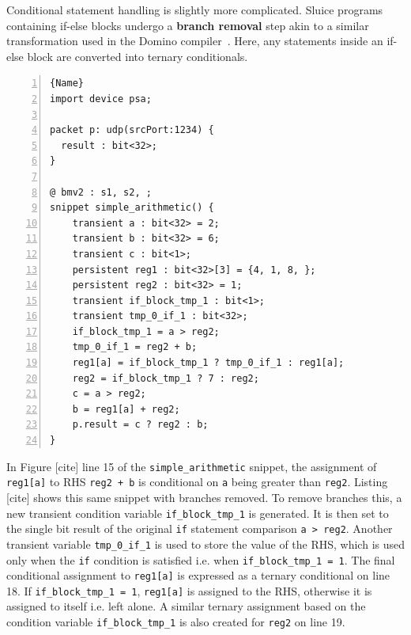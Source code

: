 \documentclass[12pt, oneside]{article}
\begin{document}
Conditional statement handling is slightly more complicated. Sluice programs containing if-else blocks undergo a \textbf{branch removal} step akin to a similar transformation used in the Domino compiler~\cite{domino}. Here, any statements inside an if-else block are converted into ternary conditionals. 

\begin{lstlisting}[numbers=left, firstnumber=1, frame=tlrb, basicstyle=\linespread{1.3}\scriptsize]{Name}
import device psa;

packet p: udp(srcPort:1234) {
  result : bit<32>;
}

@ bmv2 : s1, s2, ;
snippet simple_arithmetic() {
    transient a : bit<32> = 2;
    transient b : bit<32> = 6;
    transient c : bit<1>;
    persistent reg1 : bit<32>[3] = {4, 1, 8, };
    persistent reg2 : bit<32> = 1;
    transient if_block_tmp_1 : bit<1>;
    transient tmp_0_if_1 : bit<32>;
    if_block_tmp_1 = a > reg2;
    tmp_0_if_1 = reg2 + b;
    reg1[a] = if_block_tmp_1 ? tmp_0_if_1 : reg1[a];
    reg2 = if_block_tmp_1 ? 7 : reg2;
    c = a > reg2;
    b = reg1[a] + reg2;
    p.result = c ? reg2 : b;
}
\end{lstlisting}

In Figure [cite] line 15 of the \texttt{simple\_arithmetic} snippet, the assignment of \texttt{reg1[a]} to RHS \texttt{reg2 + b} is conditional on \texttt{a} being greater than \texttt{reg2}. Listing [cite] shows this same snippet with branches removed. To remove branches this, a new transient condition variable \texttt{if\_block\_tmp\_1} is generated. It is then set to the single bit result of the original \texttt{if} statement comparison \texttt{a > reg2}. Another transient variable \texttt{tmp\_0\_if\_1} is used to store the value of the RHS, which is used only when the \texttt{if} condition is satisfied i.e. when \texttt{if\_block\_tmp\_1 = 1}. The final conditional assignment to \texttt{reg1[a]} is expressed as a ternary conditional on line 18. If \texttt{if\_block\_tmp\_1 = 1}, \texttt{reg1[a]} is assigned to the RHS, otherwise it is assigned to itself i.e. left alone. A similar ternary assignment based on the condition variable \texttt{if\_block\_tmp\_1} is also created for \texttt{reg2} on line 19. 
\end{document}
